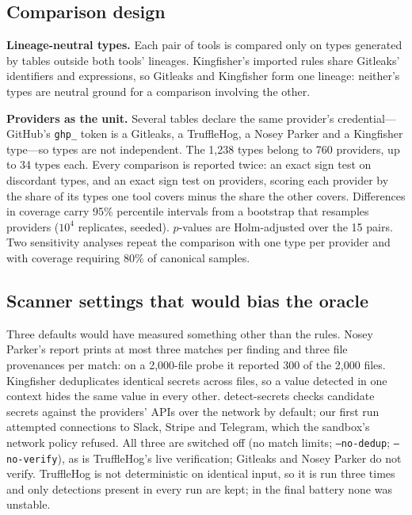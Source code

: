 \documentclass[10pt,journal,compsoc]{IEEEtran}
\begin{document}
\subsection{Comparison design}
\label{sec:comparedesign}

\textbf{Lineage-neutral types.} Each pair of tools is compared only on types generated by tables outside both tools' lineages. Kingfisher's imported rules share Gitleaks' identifiers and expressions, so Gitleaks and Kingfisher form one lineage: neither's types are neutral ground for a comparison involving the other.

\textbf{Providers as the unit.} Several tables declare the same provider's credential---GitHub's \texttt{ghp\_} token is a Gitleaks, a TruffleHog, a Nosey Parker and a Kingfisher type---so types are not independent. The 1{,}238 types belong to 760 providers, up to 34 types each. Every comparison is reported twice: an exact sign test on discordant types, and an exact sign test on providers, scoring each provider by the share of its types one tool covers minus the share the other covers. Differences in coverage carry 95\% percentile intervals from a bootstrap that resamples providers ($10^4$ replicates, seeded). $p$-values are Holm-adjusted over the 15 pairs. Two sensitivity analyses repeat the comparison with one type per provider and with coverage requiring 80\% of canonical samples.

\subsection{Scanner settings that would bias the oracle}
\label{sec:settings}

Three defaults would have measured something other than the rules. Nosey Parker's report prints at most three matches per finding and three file provenances per match: on a 2{,}000-file probe it reported 300 of the 2{,}000 files. Kingfisher deduplicates identical secrets across files, so a value detected in one context hides the same value in every other. detect-secrets checks candidate secrets against the providers' APIs over the network by default; our first run attempted connections to Slack, Stripe and Telegram, which the sandbox's network policy refused. All three are switched off (no match limits; \texttt{--no-dedup}; \texttt{--no-verify}), as is TruffleHog's live verification; Gitleaks and Nosey Parker do not verify. TruffleHog is not deterministic on identical input, so it is run three times and only detections present in every run are kept; in the final battery none was unstable.
\end{document}
